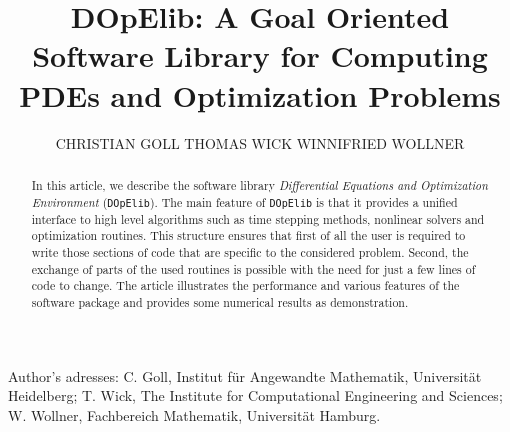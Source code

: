 \documentclass[prodmode,acmtoms]{acmsmall}
\numberwithin{equation}{section}
\newcommand{\dope}{\texttt{DOpElib}}
\begin{document}

\title{DOpElib: A Goal Oriented Software Library for Computing PDEs and Optimization Problems}

\author{CHRISTIAN GOLL
THOMAS WICK
WINNIFRIED WOLLNER
}


\begin{abstract}
In this article, we describe the software library 
\textit{Differential Equations and Optimization Environment} (\dope{}).
The main feature of \dope{} is that it provides a unified interface to high level algorithms 
such as time stepping methods, nonlinear solvers and optimization routines. This structure ensures 
that first of all the user is required to write those sections of code that are specific to 
the considered problem. Second, the exchange of parts of the used routines is possible 
with the need for just a few lines of code to change.
The article illustrates the performance and various features 
of the software package and provides some 
numerical results as demonstration.
\end{abstract}





\begin{bottomstuff}
Author's adresses: C. Goll, Institut f\"ur Angewandte Mathematik,
Universit\"at Heidelberg;
T. Wick, The Institute for Computational Engineering and Sciences;
W. Wollner, Fachbereich Mathematik, Universit\"at Hamburg.
\end{bottomstuff}
                      

\maketitle
\end{document}
